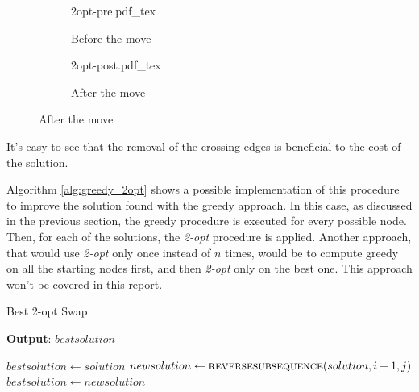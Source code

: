\documentclass{article}
\begin{document}
\begin{figure}[H]
        \caption{Example of a 2-opt move}
        \label{fig:2optmove}
        \centering
        \begin{subfigure}{.5\textwidth}
                \centering
                \def\svgwidth{.7\linewidth}
                {2opt-pre.pdf_tex}
                \caption{Before the move}
        \end{subfigure}%
        \begin{subfigure}{.5\textwidth}
                \centering
                \def\svgwidth{.7\linewidth}
                {2opt-post.pdf_tex}
                \caption{After the move}
        \end{subfigure}
\end{figure}

It's easy to see that the removal of the crossing edges is beneficial to the
cost of the solution.

Algorithm \ref{alg:greedy_2opt} shows a possible implementation of this procedure to improve
the solution found with the greedy approach. In this case, as discussed in the
previous section, the greedy procedure is executed for every possible node.
Then, for each of the solutions, the \textit{2-opt} procedure is applied.
Another approach, that would use \textit{2-opt} only once instead of $n$ times, would be
to compute greedy on all the starting nodes first, and then \textit{2-opt} only on the
best one. This approach won't be covered in this report.

\begin{algorithm}[ht]
\caption{Best 2-opt Swap}
\label{alg:best2optswap}
\hspace*{0.5em} \textbf{Output}: $bestsolution$
\begin{algorithmic}
\State $bestsolution \gets solution$
                        \State $newsolution \gets \Call{reversesubsequence}{solution, i + 1, j}$
                                \State $bestsolution \gets newsolution$
                        \EndIf
                \EndFor
        \EndFor
\EndProcedure
\end{algorithmic}
\end{algorithm}
\end{document}
